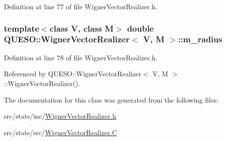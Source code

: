 Definition at line 77 of file Wigner\-Vector\-Realizer.\-h.

\hypertarget{class_q_u_e_s_o_1_1_wigner_vector_realizer_af325e618f0f529af2a2f26649be101a4}{
\subsubsection[{m\-\_\-radius}]{\setlength{\rightskip}{0pt plus 5cm}template$<$class V, class M$>$ double {\bf Q\-U\-E\-S\-O\-::\-Wigner\-Vector\-Realizer}$<$ V, M $>$\-::m\-\_\-radius\hspace{0.3cm}{\ttfamily [private]}}}\label{class_q_u_e_s_o_1_1_wigner_vector_realizer_af325e618f0f529af2a2f26649be101a4}


Definition at line 78 of file Wigner\-Vector\-Realizer.\-h.



Referenced by Q\-U\-E\-S\-O\-::\-Wigner\-Vector\-Realizer$<$ V, M $>$\-::\-Wigner\-Vector\-Realizer().



The documentation for this class was generated from the following files\-:\begin{DoxyCompactItemize}
\item 
src/stats/inc/\hyperlink{_wigner_vector_realizer_8h}{Wigner\-Vector\-Realizer.\-h}\item 
src/stats/src/\hyperlink{_wigner_vector_realizer_8_c}{Wigner\-Vector\-Realizer.\-C}\end{DoxyCompactItemize}
